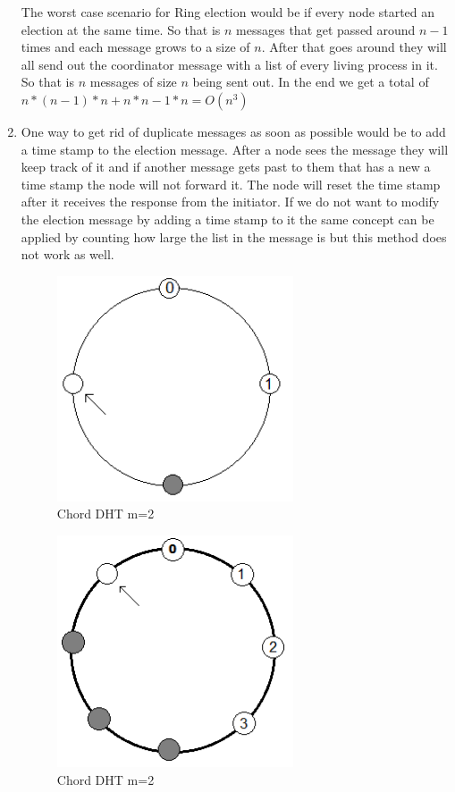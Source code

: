 \documentclass{article}
\begin{document}
\begin{enumerate}
The worst case scenario for Ring election would be if every node started an election at the same time. So that is \(n\) messages that get passed around \(n-1\) times and each message grows to a size of \(n\). After that goes around they will all send out the coordinator message with a list of every living process in it. So that is \(n\) messages of size \(n\) being sent out. In the end we get a total of  \(n*(n-1)*n+n*n-1*n =O(n^3)\)


\item One way to get rid of duplicate messages as soon as possible would be to add a time stamp to the election message. After a node sees the message they will keep track of it and if another message gets past to them that has a new a time stamp the node will not forward it. The node will reset the time stamp after it receives the response from the initiator. If we do not want to modify the election message by adding a time stamp to it the same concept can be applied by counting how large the list in the message is but this method does not work as well.


\begin{figure}[ht!]
\centering
\includegraphics[width=70mm]{q2a_m2.png}
\caption{Chord DHT m=2}
\label{fig:dht-2}
\end{figure}


\begin{figure}[ht!]
\centering
\includegraphics[width=70mm]{q2a_m3.png}
\caption{Chord DHT m=2}
\label{fig:dht-3}
\end{figure}

\end{enumerate}
\end{document}
